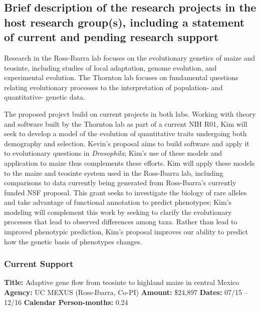 \renewcommand{\thepage}{Sponsoring Scientist Statement - Page \arabic{page} of 3}

\subsection{Brief description of the research projects in the host research group(s), including a statement of current and pending research support}

Research in the Ross-Ibarra lab focuses on the evolutionary genetics of maize and teosinte, including studies of local adaptation, genome evolution, and experimental evolution. 
The Thornton lab focuses on fundamental questions relating evolutionary processes to the interpretation of population- and quantitative- genetic data. 

The proposed project build on current projects in both labs. Working with theory and software built by the Thornton lab as part of a current NIH R01, Kim will seek to develop a model of the evolution of quantitative traits undergoing both demography and selection. Kevin's  proposal aims to build software and apply it to evolutionary questions in \emph{Drosophila}; Kim's use of these models and application to maize thus complements these efforts.  Kim will apply these models to the maize and teosinte system used in the Ross-Ibarra lab, including comparisons to data currently being generated from Ross-Ibarra's currently funded NSF proposal. This grant seeks to investigate the biology of rare alleles and take advantage of functional annotation to predict phenotypes; Kim's modeling will complement this work by seeking to clarify the evolutionary processes that lead to observed differences among taxa. Rather than lead to improved phenotypic prediction, Kim's proposal improves our ability to predict how the genetic basis of phenotypes changes.

\subsubsection*{Current Support}

\textbf{Title:} Adaptive gene flow from teosinte to highland maize in central Mexico
\textbf{Agency:} UC MEXUS (Ross-Ibarra, Co-PI)
\textbf{Amount:} \$24,897
\textbf{Dates:} 07/15 -- 12/16
\textbf{Calendar Person-months:} 0.24

